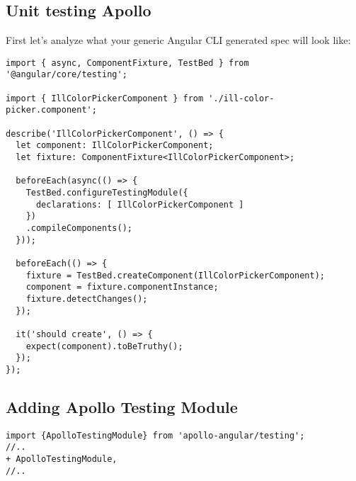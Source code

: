 \subsection { Unit testing Apollo }
First let's analyze what your generic Angular CLI generated spec will look like:
\begin{lstlisting}
import { async, ComponentFixture, TestBed } from '@angular/core/testing';

import { IllColorPickerComponent } from './ill-color-picker.component';

describe('IllColorPickerComponent', () => {
  let component: IllColorPickerComponent;
  let fixture: ComponentFixture<IllColorPickerComponent>;

  beforeEach(async(() => {
    TestBed.configureTestingModule({
      declarations: [ IllColorPickerComponent ]
    })
    .compileComponents();
  }));

  beforeEach(() => {
    fixture = TestBed.createComponent(IllColorPickerComponent);
    component = fixture.componentInstance;
    fixture.detectChanges();
  });

  it('should create', () => {
    expect(component).toBeTruthy();
  });
});

\end{lstlisting}

\subsection { Adding Apollo Testing Module }

\begin{lstlisting}
import {ApolloTestingModule} from 'apollo-angular/testing';
//..
+ ApolloTestingModule,
//..
\end{lstlisting}
